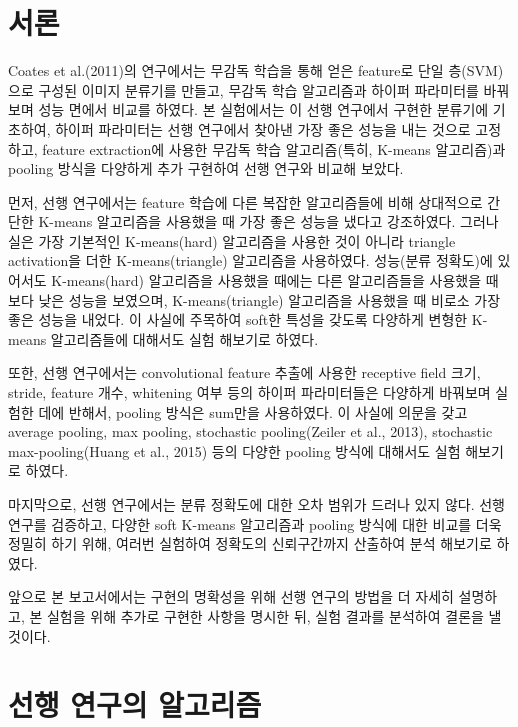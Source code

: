 \documentclass[a4paper,9pt,hidelinks]{article}
\begin{document}
\begin{multicols*}{2}

\section{서론}

Coates et al.(2011)의 연구에서는 무감독 학습을 통해 얻은 feature로 단일 층(SVM)으로 구성된 이미지 분류기를 만들고, 무감독 학습 알고리즘과 하이퍼 파라미터를 바꿔보며 성능 면에서 비교를 하였다.
본 실험에서는 이 선행 연구에서 구현한 분류기에 기초하여, 하이퍼 파라미터는 선행 연구에서 찾아낸 가장 좋은 성능을 내는 것으로 고정하고, feature extraction에 사용한 무감독 학습 알고리즘(특히, K-means 알고리즘)과 pooling 방식을 다양하게 추가 구현하여 선행 연구와 비교해 보았다.

먼저, 선행 연구에서는 feature 학습에 다른 복잡한 알고리즘들에 비해 상대적으로 간단한 K-means 알고리즘을 사용했을 때 가장 좋은 성능을 냈다고 강조하였다.
그러나 실은 가장 기본적인 K-means(hard) 알고리즘을 사용한 것이 아니라 triangle activation을 더한 K-means(triangle) 알고리즘을 사용하였다.
성능(분류 정확도)에 있어서도 K-means(hard) 알고리즘을 사용했을 때에는 다른 알고리즘들을 사용했을 때 보다 낮은 성능을 보였으며, K-means(triangle) 알고리즘을 사용했을 때 비로소 가장 좋은 성능을 내었다.
이 사실에 주목하여 soft한 특성을 갖도록 다양하게 변형한 K-means 알고리즘들에 대해서도 실험 해보기로 하였다.

또한, 선행 연구에서는 convolutional feature 추출에 사용한 receptive field 크기, stride, feature 개수, whitening 여부 등의 하이퍼 파라미터들은 다양하게 바꿔보며 실험한 데에 반해서, pooling 방식은 sum만을 사용하였다.
이 사실에 의문을 갖고 average pooling, max pooling, stochastic pooling(Zeiler et al., 2013), stochastic max-pooling(Huang et al., 2015) 등의 다양한 pooling 방식에 대해서도 실험 해보기로 하였다.

마지막으로, 선행 연구에서는 분류 정확도에 대한 오차 범위가 드러나 있지 않다.
선행 연구를 검증하고, 다양한 soft K-means 알고리즘과 pooling 방식에 대한 비교를 더욱 정밀히 하기 위해, 여러번 실험하여 정확도의 신뢰구간까지 산출하여 분석 해보기로 하였다.

앞으로 본 보고서에서는 구현의 명확성을 위해 선행 연구의 방법을 더 자세히 설명하고, 본 실험을 위해 추가로 구현한 사항을 명시한 뒤, 실험 결과를 분석하여 결론을 낼 것이다.

\section{선행 연구의 알고리즘}


\end{multicols*}
\end{document}

